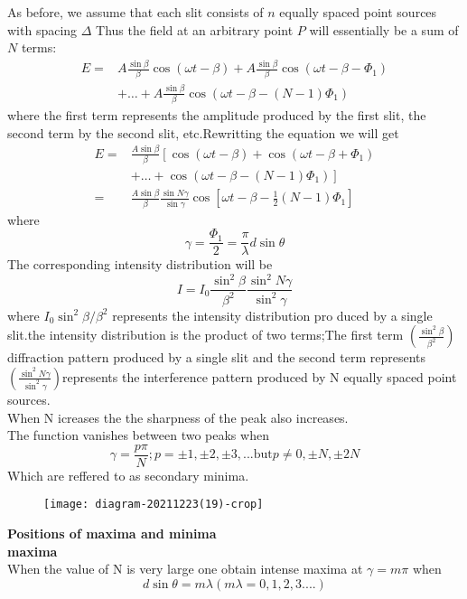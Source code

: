 As before, we assume that each slit consists of $n$ equally spaced point sources with spacing $\Delta$  Thus the field at an arbitrary point $P$ will essentially be a sum of $N$ terms:
$$\begin{aligned}
	E=& A \frac{\sin \beta}{\beta} \cos (\omega t-\beta)+A \frac{\sin \beta}{\beta} \cos \left(\omega t-\beta-\Phi_{1}\right) \\
	&+\ldots+A \frac{\sin \beta}{\beta} \cos \left(\omega t-\beta-(N-1) \Phi_{1}\right)
\end{aligned}$$
where the first term represents the amplitude produced by the first slit, the second term by the second slit, etc.Rewritting the equation we will get
$$\begin{aligned}
	E=& \frac{A \sin \beta}{\beta}\left[\cos (\omega t-\beta)+\cos \left(\omega t-\beta+\Phi_{1}\right)\right.\\
	&\left.+\ldots+\cos \left(\omega t-\beta-(N-1) \Phi_{1}\right)\right] \\
	=& \frac{A \sin \beta}{\beta} \frac{\sin N \gamma}{\sin \gamma} \cos \left[\omega t-\beta-\frac{1}{2}(N-1) \Phi_{1}\right]
\end{aligned}$$
where
$$
\gamma=\frac{\Phi_{1}}{2}=\frac{\pi}{\lambda} d \sin \theta
$$
The corresponding intensity distribution will be
$$
I=I_{0} \frac{\sin ^{2} \beta}{\beta^{2}} \frac{\sin ^{2} N \gamma}{\sin ^{2} \gamma}
$$
where $I_{0} \sin ^{2} \beta / \beta^{2}$ represents the intensity distribution pro duced by a single slit.the intensity distribution is the product of two terms;The first term $\left( \frac{\sin^2\beta}{\beta^2}\right)$  diffraction pattern produced by a single slit and the second term represents $\left( \frac{\sin^2N \gamma}{\sin^2 \gamma}\right) $represents the interference pattern produced by N equally spaced point sources.\\
When N icreases the the sharpness of the peak also increases.\\
The function vanishes between two peaks when 
$$\gamma=\frac{p\pi}{N};p=\pm1,\pm2,\pm3,... \text{but} p\neq0,\pm N,\pm2N$$
Which are reffered to as secondary minima.\\
\begin{figure}[H]
	\centering
	\texttt{[image: diagram-20211223(19)-crop]}
	\caption{}
	\label{}
\end{figure}
\textbf{Positions of maxima  and minima}\\
\textbf{maxima}\\
When the value of N is very large one obtain intense maxima at $\gamma=m\pi$ when$$d\sin \theta=m\lambda  (m\lambda=0,1,2,3....)$$
